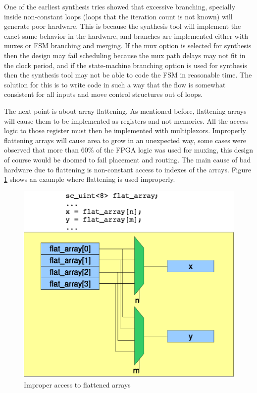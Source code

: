 \documentclass[a4paper, 12pt]{article}
\begin{document}
One of the earliest synthesis tries showed that excessive branching, specially inside non-constant loops (loops that the iteration count is not known) will generate poor hardware. This is because the synthesis tool will implement the exact same behavior in the hardware, and branches are implemented either with muxes or FSM branching and merging. If the mux option is selected for synthesis then the design may fail scheduling because the mux path delays may not fit in the clock period, and if the state-machine branching option is used for synthesis then the synthesis tool may not be able to code the FSM in reasonable time. The solution for this is to write code in such a way that the flow is somewhat consistent for all inputs and move control structures out of loops.

The next point is about array flattening. As mentioned before, flattening arrays will cause them to be implemented as registers and not memories. All the access logic to those register must then be implemented with multiplexors. Improperly flattening arrays will cause area to grow in an unexpected way, some cases were observed that more than 60\% of the FPGA logic was used for muxing, this design of course would be doomed to fail placement and routing. The main cause of bad hardware due to flattening is non-constant access to indexes of the arrays. Figure \ref{fig:flatten} shows an example where flattening is used improperly.

\begin{figure}[h]
\centering
\includegraphics{figs/flatten.eps}
\caption{Improper access to flattened arrays}
\label{fig:flatten}
\end{figure}
\end{document}
